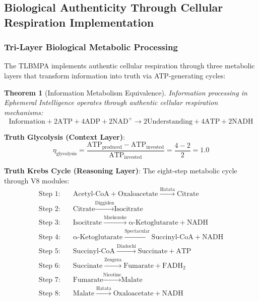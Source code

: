 \documentclass[12pt,a4paper]{article}
\newtheorem{theorem}{Theorem}
\begin{document}
\subsection{Biological Authenticity Through Cellular Respiration Implementation}

\subsubsection{Tri-Layer Biological Metabolic Processing}

The TLBMPA implements authentic cellular respiration through three metabolic layers that transform information into truth via ATP-generating cycles:

\begin{theorem}[Information Metabolism Equivalence]
Information processing in Ephemeral Intelligence operates through authentic cellular respiration mechanisms:
\begin{equation}
\text{Information} + 2\text{ATP} + 4\text{ADP} + 2\text{NAD}^+ \rightarrow 2\text{Understanding} + 4\text{ATP} + 2\text{NADH}
\end{equation}
\end{theorem}

\textbf{Truth Glycolysis (Context Layer)}:
\begin{equation}
\eta_{\text{glycolysis}} = \frac{\text{ATP}_{\text{produced}} - \text{ATP}_{\text{invested}}}{\text{ATP}_{\text{invested}}} = \frac{4 - 2}{2} = 1.0
\end{equation}

\textbf{Truth Krebs Cycle (Reasoning Layer)}:
The eight-step metabolic cycle through V8 modules:
\begin{align}
\text{Step 1:} \quad &\text{Acetyl-CoA} + \text{Oxaloacetate} \xrightarrow{\text{Hatata}} \text{Citrate} \\
\text{Step 2:} \quad &\text{Citrate} \xrightarrow{\text{Diggiden}} \text{Isocitrate} \\
\text{Step 3:} \quad &\text{Isocitrate} \xrightarrow{\text{Mzekezeke}} \text{α-Ketoglutarate} + \text{NADH} \\
\text{Step 4:} \quad &\text{α-Ketoglutarate} \xrightarrow{\text{Spectacular}} \text{Succinyl-CoA} + \text{NADH} \\
\text{Step 5:} \quad &\text{Succinyl-CoA} \xrightarrow{\text{Diadochi}} \text{Succinate} + \text{ATP} \\
\text{Step 6:} \quad &\text{Succinate} \xrightarrow{\text{Zengeza}} \text{Fumarate} + \text{FADH}_2 \\
\text{Step 7:} \quad &\text{Fumarate} \xrightarrow{\text{Nicotine}} \text{Malate} \\
\text{Step 8:} \quad &\text{Malate} \xrightarrow{\text{Hatata}} \text{Oxaloacetate} + \text{NADH}
\end{align}
\end{document}
